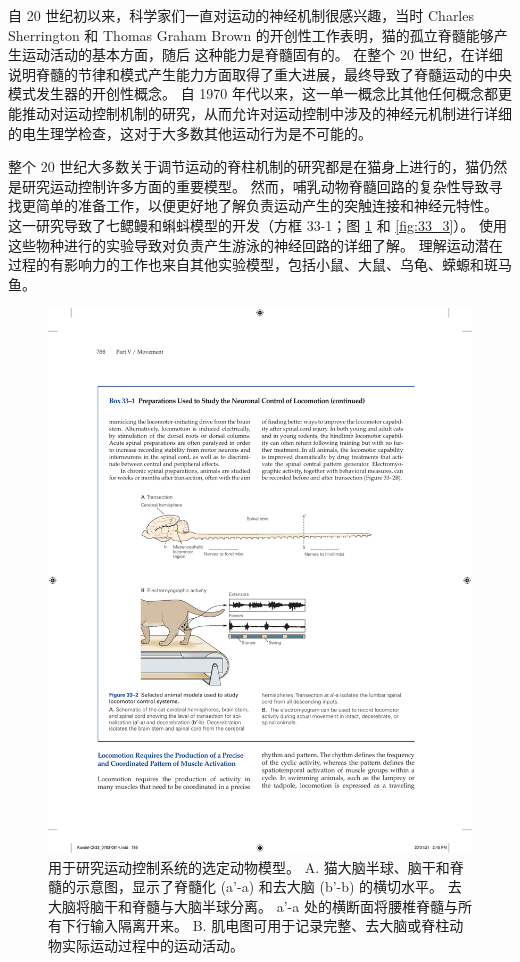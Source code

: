 自 20 世纪初以来，科学家们一直对运动的神经机制很感兴趣，当时 Charles Sherrington 和 Thomas Graham Brown 的开创性工作表明，猫的孤立脊髓能够产生运动活动的基本方面，随后 这种能力是脊髓固有的。
在整个 20 世纪，在详细说明脊髓的节律和模式产生能力方面取得了重大进展，最终导致了脊髓运动的中央模式发生器的开创性概念。
自 1970 年代以来，这一单一概念比其他任何概念都更能推动对运动控制机制的研究，从而允许对运动控制中涉及的神经元机制进行详细的电生理学检查，这对于大多数其他运动行为是不可能的。


整个 20 世纪大多数关于调节运动的脊柱机制的研究都是在猫身上进行的，猫仍然是研究运动控制许多方面的重要模型。
然而，哺乳动物脊髓回路的复杂性导致寻找更简单的准备工作，以便更好地了解负责运动产生的突触连接和神经元特性。
这一研究导致了七鳃鳗和蝌蚪模型的开发（方框 33-1；图 \ref{fig:33_2} 和 \ref{fig:33_3}）。 
使用这些物种进行的实验导致对负责产生游泳的神经回路的详细了解。 理解运动潜在过程的有影响力的工作也来自其他实验模型，包括小鼠、大鼠、乌龟、蝾螈和斑马鱼。


\begin{figure}[htbp]
	\centering
	\includegraphics[width=0.7\linewidth]{chap33/fig_33_2}
	\caption{用于研究运动控制系统的选定动物模型。 A. 猫大脑半球、脑干和脊髓的示意图，显示了脊髓化 (a'-a) 和去大脑 (b'-b) 的横切水平。 去大脑将脑干和脊髓与大脑半球分离。 a'-a 处的横断面将腰椎脊髓与所有下行输入隔离开来。 B. 肌电图可用于记录完整、去大脑或脊柱动物实际运动过程中的运动活动。}
	\label{fig:33_2}
\end{figure}

